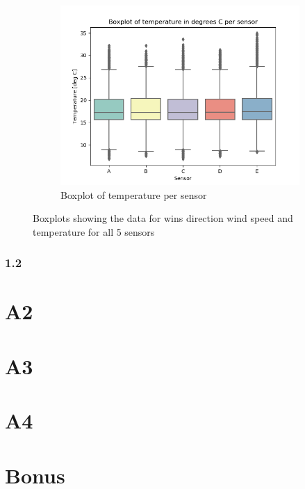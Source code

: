 \documentclass[whitelogo]{tudelft-report}
\begin{document}
\begin{figure}[h!]
\begin{subfigure}[b]{0.4\linewidth}
    \includegraphics[width=\linewidth]{Boxplot of temperature per sensor.png}
    \caption{Boxplot of temperature per sensor}
  \end{subfigure}
  \caption{Boxplots showing the data for wins direction wind speed and temperature for all 5 sensors}
  \label{fig:boxplots}
\end{figure}


\subsection {1.2}

\chapter {A2}
\chapter {A3}

\chapter {A4}

\chapter {Bonus}


%

\appendix
\begin{appendix}
  \listoffigures
  \listoftables
\end{appendix}
\end{document}
